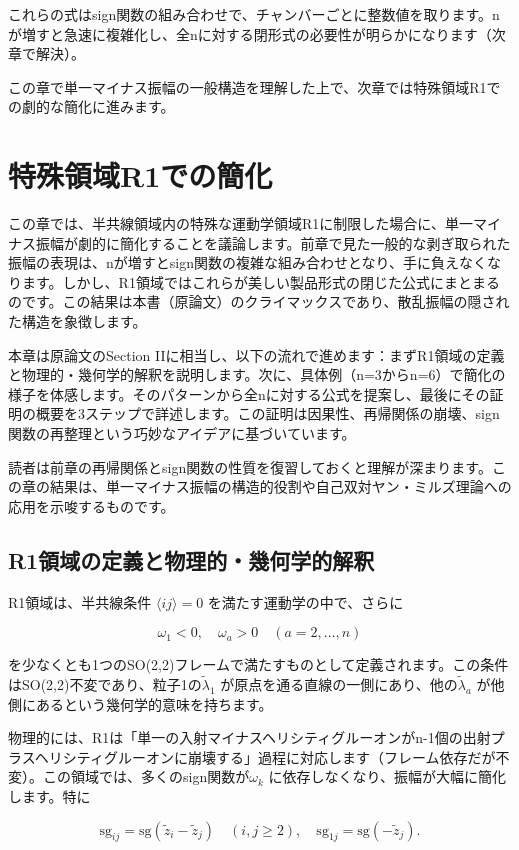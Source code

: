 \documentclass[dvipdfmx,a4paper]{jsbook}
\theoremstyle{definition}
\theoremstyle{remark}
\begin{document}
これらの式はsign関数の組み合わせで、チャンバーごとに整数値を取ります。nが増すと急速に複雑化し、全nに対する閉形式の必要性が明らかになります（次章で解決）。

この章で単一マイナス振幅の一般構造を理解した上で、次章では特殊領域R1での劇的な簡化に進みます。

\chapter{特殊領域R1での簡化}

この章では、半共線領域内の特殊な運動学領域R1に制限した場合に、単一マイナス振幅が劇的に簡化することを議論します。前章で見た一般的な剥ぎ取られた振幅の表現は、nが増すとsign関数の複雑な組み合わせとなり、手に負えなくなります。しかし、R1領域ではこれらが美しい製品形式の閉じた公式にまとまるのです。この結果は本書（原論文）のクライマックスであり、散乱振幅の隠された構造を象徴します。

本章は原論文のSection IIに相当し、以下の流れで進めます：まずR1領域の定義と物理的・幾何学的解釈を説明します。次に、具体例（n=3からn=6）で簡化の様子を体感します。そのパターンから全nに対する公式を提案し、最後にその証明の概要を3ステップで詳述します。この証明は因果性、再帰関係の崩壊、sign関数の再整理という巧妙なアイデアに基づいています。

読者は前章の再帰関係とsign関数の性質を復習しておくと理解が深まります。この章の結果は、単一マイナス振幅の構造的役割や自己双対ヤン・ミルズ理論への応用を示唆するものです。

\section{R1領域の定義と物理的・幾何学的解釈}

R1領域は、半共線条件 \(\langle ij \rangle = 0\) を満たす運動学の中で、さらに

\[
\omega_1 < 0, \quad \omega_a > 0 \quad (a=2,\dots,n)
\]

を少なくとも1つのSO(2,2)フレームで満たすものとして定義されます。この条件はSO(2,2)不変であり、粒子1の\(\tilde{\lambda}_1\) が原点を通る直線の一側にあり、他の\(\tilde{\lambda}_a\) が他側にあるという幾何学的意味を持ちます。

物理的には、R1は「単一の入射マイナスヘリシティグルーオンがn-1個の出射プラスヘリシティグルーオンに崩壊する」過程に対応します（フレーム依存だが不変）。この領域では、多くのsign関数が\(\omega_k\) に依存しなくなり、振幅が大幅に簡化します。特に

\[
\mathrm{sg}_{ij} = \mathrm{sg}(\tilde{z}_i - \tilde{z}_j) \quad (i,j \geq 2), \quad \mathrm{sg}_{1j} = \mathrm{sg}(-\tilde{z}_j).
\]
\end{document}
